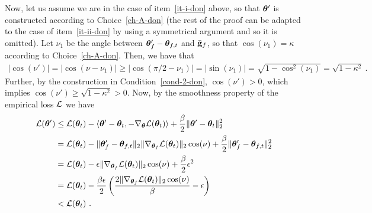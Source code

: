 %
Now, let us assume we are in the case of item~\eqref{it-i-don} above, so that ${\bm{\theta}}'$ is constructed according to Choice~\eqref{ch-A-don} (the rest of the proof can be adapted to the case of item~\eqref{it-ii-don} by using a symmetrical argument and so it is omitted). %
Let $\nu_1$ be the angle between ${\bm{\theta}}'_f-{\bm{\theta}}_{f,t}$ and $\bar{\mathbf{g}}_f$, so that $\cos(\nu_1)=\kappa$ according to Choice~\eqref{ch-A-don}.
%
Then, we have that 
\begin{align*}
|\cos(\nu')| = |\cos(\nu - \nu_1)| \geq |\cos(\pi/2 - \nu_1)| = |\sin(\nu_1)| = \sqrt{1-\cos^2(\nu_1)} = \sqrt{1-\kappa^2}~.
\end{align*}
Further, by the construction in Condition~\eqref{cond-2-don}, $\cos(\nu') > 0$, which implies 
$\cos(\nu') \geq  \sqrt{1-\kappa^2}>0$.
%
%
%
Now, 
by the smoothness property of the empirical loss ${\cal L}$ we have
\begin{align*}
{\cal L}({\bm{\theta}}') & \leq {\cal L}({\bm{\theta}}_t) - \langle {\bm{\theta}}' - {\bm{\theta}}_t, -\nabla_{\bm{\theta}} {\cal L}({\bm{\theta}}_t) \rangle + \frac{\beta}{2}\| {\bm{\theta}}' - {\bm{\theta}}_t \|_2^2 \\ 
& = {\cal L}({\bm{\theta}}_t) - \|{\bm{\theta}}'_f - {\bm{\theta}}_{f,t}\|_2 \|\nabla_{{\bm{\theta}}_f} {\cal L}({\bm{\theta}}_t) \|_2 \cos(\nu) + \frac{\beta}{2}\| {\bm{\theta}}'_f - {\bm{\theta}}_{f,t} \|_2^2 \\
& =  {\cal L}({\bm{\theta}}_t) -  \epsilon \|\nabla_{{\bm{\theta}}_f} {\cal L}({\bm{\theta}}_t) \|_2 \cos(\nu) + \frac{\beta}{2} \epsilon^2 \\
& = {\cal L}({\bm{\theta}}_t) -  \frac{\beta \epsilon}{2} \left( \frac{2 \|\nabla_{{\bm{\theta}}_f} {\cal L}({\bm{\theta}}_t) \|_2 \cos(\nu)}{\beta} - \epsilon \right)\\
&<{\cal L}({\bm{\theta}}_t)~.
\end{align*}
